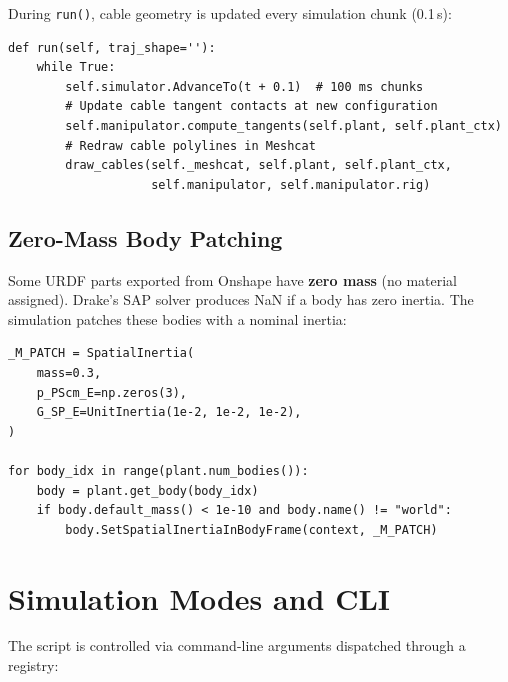 \documentclass[11pt,a4paper]{article}
\begin{document}
During \texttt{run()}, cable geometry is updated every simulation chunk (0.1\,s):

\begin{lstlisting}[caption={Cable visualization update in the simulation loop.}]
def run(self, traj_shape=''):
    while True:
        self.simulator.AdvanceTo(t + 0.1)  # 100 ms chunks
        # Update cable tangent contacts at new configuration
        self.manipulator.compute_tangents(self.plant, self.plant_ctx)
        # Redraw cable polylines in Meshcat
        draw_cables(self._meshcat, self.plant, self.plant_ctx,
                    self.manipulator, self.manipulator.rig)
\end{lstlisting}

\subsection{Zero-Mass Body Patching}

\begin{warnbox}
Some URDF parts exported from Onshape have \textbf{zero mass} (no material assigned). Drake's SAP solver produces NaN if a body has zero inertia. The simulation patches these bodies with a nominal inertia:
\end{warnbox}

\begin{lstlisting}[caption={Zero-mass body fix --- \texttt{Simulation.\_patch\_zero\_mass\_bodies()}}]
_M_PATCH = SpatialInertia(
    mass=0.3,
    p_PScm_E=np.zeros(3),
    G_SP_E=UnitInertia(1e-2, 1e-2, 1e-2),
)

for body_idx in range(plant.num_bodies()):
    body = plant.get_body(body_idx)
    if body.default_mass() < 1e-10 and body.name() != "world":
        body.SetSpatialInertiaInBodyFrame(context, _M_PATCH)
\end{lstlisting}


\section{Simulation Modes and CLI}
\label{sec:modes}

The script is controlled via command-line arguments dispatched through a registry:
\end{document}
